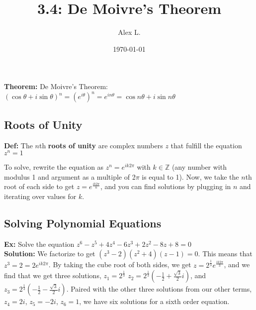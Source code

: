 \documentclass{article}
\title{3.4: De Moivre's Theorem}
\author{Alex L.}
\date{\today}
\begin{document}
\maketitle

\textbf{Theorem:} De Moivre's Theorem: $(\cos\theta + i\sin\theta)^n = (e^{i\theta})^n = e^{in\theta} = \cos n\theta + i\sin n\theta$

\subsection{Roots of Unity}

\textbf{Def:} The $n$th \textbf{roots of unity} are complex numbers $z$ that fulfill the equation $z^n = 1$

To solve, rewrite the equation as $z^n = e^{ik2\pi}$ with $k \in \mathbb{Z}$ (any number with modulus 1 and argument as a multiple of 2$\pi$ is equal to 1). Now, we take the $n$th root of each side to get $z = e^{\frac{ik2\pi}{n}}$, and you can find solutions by plugging in $n$ and iterating over values for $k$.

\subsection{Solving Polynomial Equations}

\textbf{Ex:} Solve the equation $z^6 - z^5 + 4z^4 - 6z^3 + 2z^2 -8z + 8 =0$ \\ \textbf{Solution:} We factorize to get $(z^3 -2)(z^2 + 4)(z-1) = 0$. This means that $z^3 = 2 = 2e^{ik2\pi}$. By taking the cube root of both sides, we get $z = 2^{\frac{1}{3}}e^{\frac{ik2\pi}{3}}$, and we find that we get three solutions, $z_1 = 2^{\frac{1}{3}}$ $z_2 = 2^{\frac{1}{3}}(-\frac{1}{2} + \frac{\sqrt{3}}{2}i)$, and $z_3 = 2^{\frac{1}{3}}(-\frac{1}{2} - \frac{\sqrt{3}}{2}i)$. Paired with the other three solutions from our other terms, $z_4 = 2i$, $z_5 = -2i$, $z_6 = 1$, we have six solutions for a sixth order equation.
\end{document}
